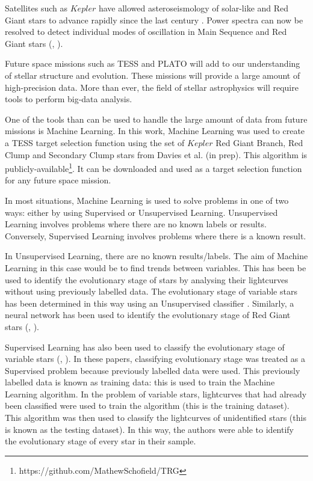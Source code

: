\documentclass[a4paper,fleqn,usenatbib,useAMS]{mnras}
\begin{document}
\iffalse
Satellites such as $Kepler$ have allowed asteroseismology of solar-like and Red Giant stars to advance rapidly since the last century \citet{chaplin_asteroseismology_2013}. Power spectra can now be resolved to detect individual modes of oscillation in Main Sequence and Red Giant stars (\citet{lund_standing_2017}, \citet{davies_asteroseismology_2016}).

Future space missions such as TESS \citep{ricker_transiting_2014} and PLATO \citep{rauer_plato_2014} will add to our understanding of stellar structure and evolution. These missions will provide a large amount of high-precision data. More than ever, the field of stellar astrophysics will require tools to perform big-data analysis. %

One of the tools than can be used to handle the large amount of data from future missions is Machine Learning. In this work, Machine Learning was used to create a TESS target selection function using the set of $Kepler$ Red Giant Branch, Red Clump and Secondary Clump stars from Davies et al. (in prep). This algorithm is publicly-available\footnote{https://github.com/MathewSchofield/TRG}. It can be downloaded and used as a target selection function for any future space mission.

In most situations, Machine Learning is used to solve problems in one of two ways: either by using Supervised or Unsupervised Learning. Unsupervised Learning involves problems where there are no known labels or results. Conversely, Supervised Learning involves problems where there is a known result.

In Unsupervised Learning, there are no known results/labels. The aim of Machine Learning in this case would be to find trends between variables. This has been be used to identify the evolutionary stage of stars by analysing their lightcurves without using previously labelled data. The evolutionary stage of variable stars has been determined in this way using an Unsupervised classifier \citep{valenzuela_unsupervised_2018}. Similarly, a neural network has been used to identify the evolutionary stage of Red Giant stars (\citet{hon_deep_2017}, \citet{hon_deep_2018}).

Supervised Learning has also been used to classify the evolutionary stage of variable stars (\citet{nun_supervised_2014}, \citet{elorrieta_machine_2016}). In these papers, classifying evolutionary stage was treated as a Supervised problem because previously labelled data were used. This previously labelled data is known as training data: this is used to train the Machine Learning algorithm. In the problem of variable stars, lightcurves that had already been classified were used to train the algorithm (this is the training dataset). This algorithm was then used to classify the lightcurves of unidentified stars (this is known as the testing dataset). In this way, the authors were able to identify the evolutionary stage of every star in their sample.
\end{document}
